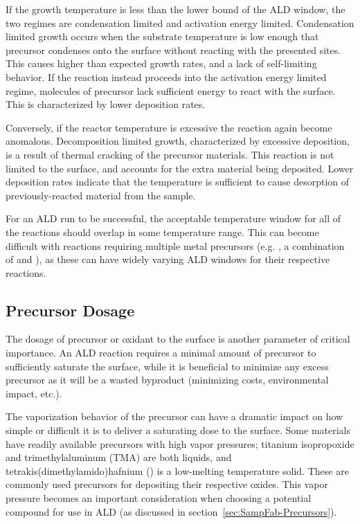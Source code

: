 If the growth temperature is less than the lower bound of the ALD window, the two regimes are condensation limited and activation energy limited. Condensation limited growth occurs when the substrate temperature is low enough that precursor condenses onto the surface without reacting with the presented sites. This causes higher than expected growth rates, and a lack of self-limiting behavior. If the reaction instead proceeds into the activation energy limited regime, molecules of precursor lack sufficient energy to react with the surface. This is characterized by lower deposition rates. 

Conversely, if the reactor temperature is excessive the reaction again become anomalous. Decomposition limited growth, characterized by excessive deposition, is a result of thermal cracking of the precursor materials. This reaction is not limited to the surface, and accounts for the extra material being deposited. Lower deposition rates indicate that the temperature is sufficient to cause desorption of previously-reacted material from the sample. 

For an ALD run to be successful, the acceptable temperature window for all of the reactions should overlap in some temperature range. This can become difficult with reactions requiring multiple metal precursors (e.g. \PTO, a combination of  and ), as these can have widely varying ALD windows for their respective reactions. 


\subsection{Precursor Dosage}

The dosage of precursor or oxidant to the surface is another parameter of critical importance. An ALD reaction requires a minimal amount of precursor to sufficiently saturate the surface, while it is beneficial to minimize any excess precursor as it will be a wasted byproduct (minimizing costs, environmental impact, etc.). 

The vaporization behavior of the precursor can have a dramatic impact on how simple or difficult it is to deliver a saturating dose to the surface. Some materials have readily available precursors with high vapor pressures; titanium isopropoxide and trimethylaluminum (TMA) are both liquids, and tetrakis(dimethylamido)hafnium () is a low-melting temperature solid. These are commonly used precursors for depositing their respective oxides. This vapor pressure becomes an important consideration when choosing a potential compound for use in ALD (as discussed in section~\vref{sec:SampFab-Precursors}).

